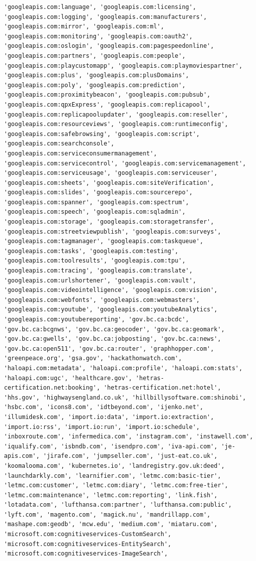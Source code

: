 \documentclass[11pt]{article}
\begin{document}
\begin{Verbatim}[commandchars=\\\{\}]
'googleapis.com:language', 'googleapis.com:licensing', 'googleapis.com:logging', 'googleapis.com:manufacturers', 'googleapis.com:mirror', 'googleapis.com:ml', 'googleapis.com:monitoring', 'googleapis.com:oauth2', 'googleapis.com:oslogin', 'googleapis.com:pagespeedonline', 'googleapis.com:partners', 'googleapis.com:people', 'googleapis.com:playcustomapp', 'googleapis.com:playmoviespartner', 'googleapis.com:plus', 'googleapis.com:plusDomains', 'googleapis.com:poly', 'googleapis.com:prediction', 'googleapis.com:proximitybeacon', 'googleapis.com:pubsub', 'googleapis.com:qpxExpress', 'googleapis.com:replicapool', 'googleapis.com:replicapoolupdater', 'googleapis.com:reseller', 'googleapis.com:resourceviews', 'googleapis.com:runtimeconfig', 'googleapis.com:safebrowsing', 'googleapis.com:script', 'googleapis.com:searchconsole', 'googleapis.com:serviceconsumermanagement', 'googleapis.com:servicecontrol', 'googleapis.com:servicemanagement', 'googleapis.com:serviceusage', 'googleapis.com:serviceuser', 'googleapis.com:sheets', 'googleapis.com:siteVerification', 'googleapis.com:slides', 'googleapis.com:sourcerepo', 'googleapis.com:spanner', 'googleapis.com:spectrum', 'googleapis.com:speech', 'googleapis.com:sqladmin', 'googleapis.com:storage', 'googleapis.com:storagetransfer', 'googleapis.com:streetviewpublish', 'googleapis.com:surveys', 'googleapis.com:tagmanager', 'googleapis.com:taskqueue', 'googleapis.com:tasks', 'googleapis.com:testing', 'googleapis.com:toolresults', 'googleapis.com:tpu', 'googleapis.com:tracing', 'googleapis.com:translate', 'googleapis.com:urlshortener', 'googleapis.com:vault', 'googleapis.com:videointelligence', 'googleapis.com:vision', 'googleapis.com:webfonts', 'googleapis.com:webmasters', 'googleapis.com:youtube', 'googleapis.com:youtubeAnalytics', 'googleapis.com:youtubereporting', 'gov.bc.ca:bcdc', 'gov.bc.ca:bcgnws', 'gov.bc.ca:geocoder', 'gov.bc.ca:geomark', 'gov.bc.ca:gwells', 'gov.bc.ca:jobposting', 'gov.bc.ca:news', 'gov.bc.ca:open511', 'gov.bc.ca:router', 'graphhopper.com', 'greenpeace.org', 'gsa.gov', 'hackathonwatch.com', 'haloapi.com:metadata', 'haloapi.com:profile', 'haloapi.com:stats', 'haloapi.com:ugc', 'healthcare.gov', 'hetras-certification.net:booking', 'hetras-certification.net:hotel', 'hhs.gov', 'highwaysengland.co.uk', 'hillbillysoftware.com:shinobi', 'hsbc.com', 'icons8.com', 'idtbeyond.com', 'ijenko.net', 'illumidesk.com', 'import.io:data', 'import.io:extraction', 'import.io:rss', 'import.io:run', 'import.io:schedule', 'inboxroute.com', 'infermedica.com', 'instagram.com', 'instawell.com', 'iqualify.com', 'isbndb.com', 'isendpro.com', 'iva-api.com', 'je-apis.com', 'jirafe.com', 'jumpseller.com', 'just-eat.co.uk', 'koomalooma.com', 'kubernetes.io', 'landregistry.gov.uk:deed', 'launchdarkly.com', 'learnifier.com', 'letmc.com:basic-tier', 'letmc.com:customer', 'letmc.com:diary', 'letmc.com:free-tier', 'letmc.com:maintenance', 'letmc.com:reporting', 'link.fish', 'lotadata.com', 'lufthansa.com:partner', 'lufthansa.com:public', 'lyft.com', 'magento.com', 'magick.nu', 'mandrillapp.com', 'mashape.com:geodb', 'mcw.edu', 'medium.com', 'miataru.com', 'microsoft.com:cognitiveservices-CustomSearch', 'microsoft.com:cognitiveservices-EntitySearch', 'microsoft.com:cognitiveservices-ImageSearch', 
\end{Verbatim}
\end{document}
